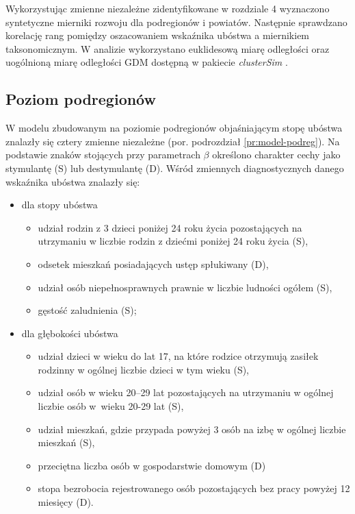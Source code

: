 Wykorzystując zmienne niezależne zidentyfikowane w rozdziale 4 wyznaczono syntetyczne mierniki rozwoju dla podregionów i powiatów. Następnie sprawdzano korelację rang pomiędzy oszacowaniem wskaźnika ubóstwa a miernikiem taksonomicznym. W analizie wykorzystano euklidesową miarę odległości oraz uogólnioną miarę odległości GDM \citep{Jajuga2003} dostępną w pakiecie \textit{clusterSim} \citep{clustersim2017}.

\subsection{Poziom podregionów}

W modelu zbudowanym na poziomie podregionów objaśniającym stopę ubóstwa znalazły się cztery zmienne niezależne (por. podrozdział \ref{pr:model-podreg}). Na podstawie znaków stojących przy parametrach $\beta$ określono charakter cechy jako stymulantę (S) lub destymulantę (D). Wśród zmiennych diagnostycznych danego wskaźnika ubóstwa znalazły się:

\begin{itemize}
\item dla stopy ubóstwa
\begin{itemize}
\item udział rodzin z 3 dzieci poniżej 24 roku życia pozostających na utrzymaniu w liczbie rodzin z dziećmi poniżej 24 roku życia (S), 
\item odsetek mieszkań posiadających ustęp spłukiwany (D),
\item udział osób niepełnosprawnych prawnie w liczbie ludności ogółem (S),
\item gęstość zaludnienia (S);
\end{itemize}
\item dla głębokości ubóstwa
\begin{itemize}
\item udział dzieci w wieku do lat 17, na które rodzice otrzymują zasiłek rodzinny w ogólnej liczbie dzieci w tym wieku (S), 
\item udział osób w wieku 20--29 lat pozostających na utrzymaniu w ogólnej liczbie osób w~wieku 20-29 lat (S), 
\item udział mieszkań, gdzie przypada powyżej 3 osób na izbę w ogólnej liczbie mieszkań (S), 
\item przeciętna liczba osób w gospodarstwie domowym (D) 
\item stopa bezrobocia rejestrowanego osób pozostających bez pracy powyżej 12 miesięcy (D).
\end{itemize}
\end{itemize}

